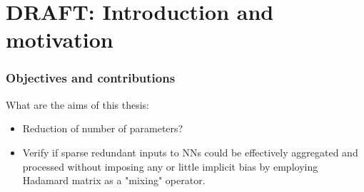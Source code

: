 \section*{DRAFT: Introduction and motivation}
\subsubsection{Objectives and contributions}
What are the aims of this thesis:
\begin{itemize}
    \item Reduction of number of parameters?
    \item Verify if sparse redundant inputs to NNs could be effectively aggregated and processed without imposing any or little implicit bias by employing Hadamard matrix as a "mixing" operator.
\end{itemize}